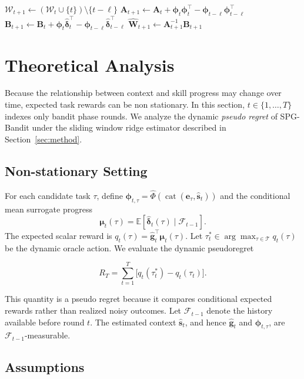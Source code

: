 \documentclass{article} %
\begin{document}
\begin{algorithm}[t]
\begin{algorithmic}
    \STATE \(\mathcal{W}_{t+1}\gets(\mathcal{W}_t\cup\{t\})\setminus\{t-\ell\}\)
    \STATE \(\mathbf{A}_{t+1}\gets\mathbf{A}_t+\boldsymbol{\phi}_t\boldsymbol{\phi}_t^\top-\boldsymbol{\phi}_{t-\ell}\boldsymbol{\phi}_{t-\ell}^\top\)
    \STATE \(\mathbf{B}_{t+1}\gets\mathbf{B}_t+\boldsymbol{\phi}_t\widehat{\boldsymbol{\delta}}_t^\top-\boldsymbol{\phi}_{t-\ell}\widehat{\boldsymbol{\delta}}_{t-\ell}^\top\)
    \STATE \(\widehat{\mathbf{W}}_{t+1}\gets\mathbf{A}_{t+1}^{-1}\mathbf{B}_{t+1}\)
\ENDFOR
\end{algorithmic}
\end{algorithm}

\section{Theoretical Analysis}
\label{sec:theory}

Because the relationship between context and skill progress may change over time, expected task rewards can be non stationary. In this section, \(t\in\{1,\ldots,T\}\) indexes only bandit phase rounds. We analyze the dynamic \emph{pseudo regret} of SPG-Bandit under the sliding window ridge estimator described in Section~\ref{sec:method}.

\subsection{Non-stationary Setting}

For each candidate task \(\tau\), define \(\boldsymbol{\phi}_{t,\tau}=\widehat\Phi(\operatorname{cat}(\mathbf{e}_\tau,\widehat{\mathbf{s}}_t))\) and the conditional mean surrogate progress
\[
\boldsymbol{\mu}_t(\tau)=\mathbb{E}[\widehat{\boldsymbol{\delta}}_t(\tau)\mid\mathcal{F}_{t-1}].
\]
The expected scalar reward is \(q_t(\tau)=\widehat{\mathbf{g}}_t^\top\boldsymbol{\mu}_t(\tau)\). Let \(\tau_t^*\in\arg\max_{\tau\in\mathcal{T}}q_t(\tau)\) be the dynamic oracle action. We evaluate the dynamic pseudoregret

\[
    R_T=\sum_{t=1}^{T}\bigl[q_t(\tau_t^*)-q_t(\tau_t)\bigr].
\]

This quantity is a pseudo regret because it compares conditional expected rewards rather than realized noisy outcomes. Let \(\mathcal{F}_{t-1}\) denote the history available before round \(t\). The estimated context \(\widehat{\mathbf{s}}_t\), and hence \(\widehat{\mathbf{g}}_t\) and \(\boldsymbol{\phi}_{t,\tau}\), are \(\mathcal{F}_{t-1}\)-measurable.

\subsection{Assumptions}
\end{document}
